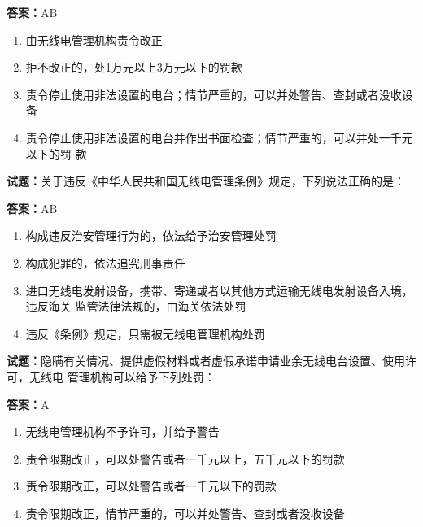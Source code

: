 \documentclass{ctexbook}
\begin{document}
\textbf{答案：}AB 

\begin{enumerate}[leftmargin=3em]
  \item 由无线电管理机构责令改正 

  \item 拒不改正的，处1万元以上3万元以下的罚款 


  \item 责令停止使用非法设置的电台；情节严重的，可以并处警告、查封或者没收设备 

  \item 责令停止使用非法设置的电台并作出书面检查；情节严重的，可以并处一千元以下的罚
款 

\end{enumerate}





\vspace{1em}

\textbf{试题：}关于违反《中华人民共和国无线电管理条例》规定，下列说法正确的是： 

\textbf{答案：}AB 

\begin{enumerate}[leftmargin=3em]
  \item 构成违反治安管理行为的，依法给予治安管理处罚 

  \item 构成犯罪的，依法追究刑事责任 

  \item 进口无线电发射设备，携带、寄递或者以其他方式运输无线电发射设备入境，违反海关
监管法律法规的，由海关依法处罚 

  \item 违反《条例》规定，只需被无线电管理机构处罚 

\end{enumerate}





\vspace{1em}

\textbf{试题：}隐瞒有关情况、提供虚假材料或者虚假承诺申请业余无线电台设置、使用许可，无线电
管理机构可以给予下列处罚： 

\textbf{答案：}A 

\begin{enumerate}[leftmargin=3em]
  \item 无线电管理机构不予许可，并给予警告 

  \item 责令限期改正，可以处警告或者一千元以上，五千元以下的罚款 

  \item 责令限期改正，可以处警告或者一千元以下的罚款 

  \item 责令限期改正，情节严重的，可以并处警告、查封或者没收设备 

\end{enumerate}
\end{document}
